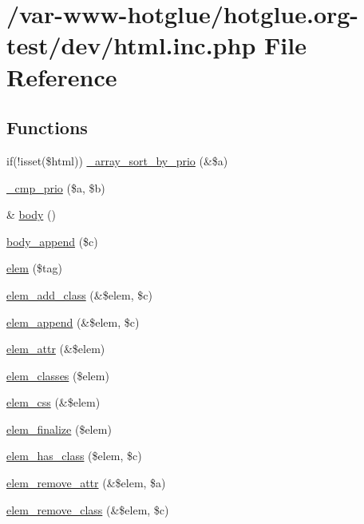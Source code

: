 \hypertarget{html_8inc_8php}{
\section{/var-\/www-\/hotglue/hotglue.org-\/test/dev/html.inc.php File Reference}
\label{html_8inc_8php}
}
\subsection*{Functions}
\begin{DoxyCompactItemize}
\item 
if(!isset(\$html)) \hyperlink{html_8inc_8php_a7fb2b386b2bae219112628971275c225}{\_\-array\_\-sort\_\-by\_\-prio} (\&\$a)
\item 
\hyperlink{html_8inc_8php_af8ecadff0a4b78867d4da5eae49615e1}{\_\-cmp\_\-prio} (\$a, \$b)
\item 
\& \hyperlink{html_8inc_8php_a8b842636055e9a5853a7a10a9e002330}{body} ()
\item 
\hyperlink{html_8inc_8php_ad27881abf3a2004d287434d8c8d7cdf6}{body\_\-append} (\$c)
\item 
\hyperlink{html_8inc_8php_aa7a1256f84f937f1656195d5ce7b8d91}{elem} (\$tag)
\item 
\hyperlink{html_8inc_8php_aafa12d2b690751666e599fb052e19ca6}{elem\_\-add\_\-class} (\&\$elem, \$c)
\item 
\hyperlink{html_8inc_8php_aea37c451f5d55e2efbb2656e340c1dae}{elem\_\-append} (\&\$elem, \$c)
\item 
\hyperlink{html_8inc_8php_a894dc22f3b7668c59364599909162b8e}{elem\_\-attr} (\&\$elem)
\item 
\hyperlink{html_8inc_8php_a821651b8923938645b0b0fa6bb084522}{elem\_\-classes} (\$elem)
\item 
\hyperlink{html_8inc_8php_ac705ef06deb9e2d49e342ed78ecc1c9a}{elem\_\-css} (\&\$elem)
\item 
\hyperlink{html_8inc_8php_af04b43a4dd09e73ca2cef84a4f2e9381}{elem\_\-finalize} (\$elem)
\item 
\hyperlink{html_8inc_8php_ab1019c4b75181c1c1af10e1c1e5e197d}{elem\_\-has\_\-class} (\$elem, \$c)
\item 
\hyperlink{html_8inc_8php_aeb7074172d9164f69e64967b6bcdc643}{elem\_\-remove\_\-attr} (\&\$elem, \$a)
\item 
\hyperlink{html_8inc_8php_a6a224914e8f32176ca11a31154b1ae13}{elem\_\-remove\_\-class} (\&\$elem, \$c)

\end{DoxyCompactItemize}
